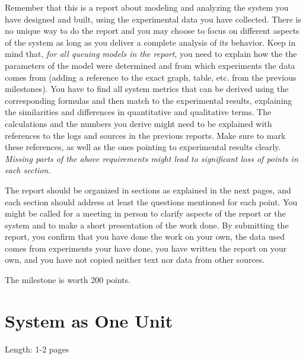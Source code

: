 \documentclass[11pt]{article}
\begin{document}
Remember  that  this is  a  report  about modeling  and  analyzing the  system you  have  designed  and  built, using  the experimental data you have collected. There is no unique way to do the report and you may choose  to  focus  on  different  aspects  of  the  system  as  long  as  you deliver a  complete analysis of  its behavior. Keep in mind that, \emph{for all queuing models in the report}, you need to explain how the the parameters of the model were determined and from which experiments the data comes from (adding a reference to the exact graph, table, etc. from the previous milestones). You have to find all system metrics that can be derived using the corresponding formulas and then match to the experimental results, explaining the similarities and differences in quantitative and qualitative terms. The calculations and the numbers you derive might need to be explained with references to the logs and sources in the previous reports. Make sure to mark these references, as well as the ones pointing to experimental results clearly. \textit{Missing parts of the above requirements might lead to significant loss of points in each section.}

The report should be organized in sections as explained in the next pages, and each section should address at least the questions mentioned for each point. You might be called for a meeting in person to clarify aspects of the report or the system and to make a short presentation of the work done. By submitting the report, you  confirm  that  you  have  done  the  work  on  your  own,  the  data used comes  from  experiments  your have  done,  you  have  written  the  report  on  your  own,  and  you have  not  copied  neither text nor data from other sources.

\medskip
The milestone is worth 200 points. 

\pagebreak

\clearpage
\section{System as One Unit}\label{sec:system-one-unit}

Length: 1-2 pages
\end{document}
